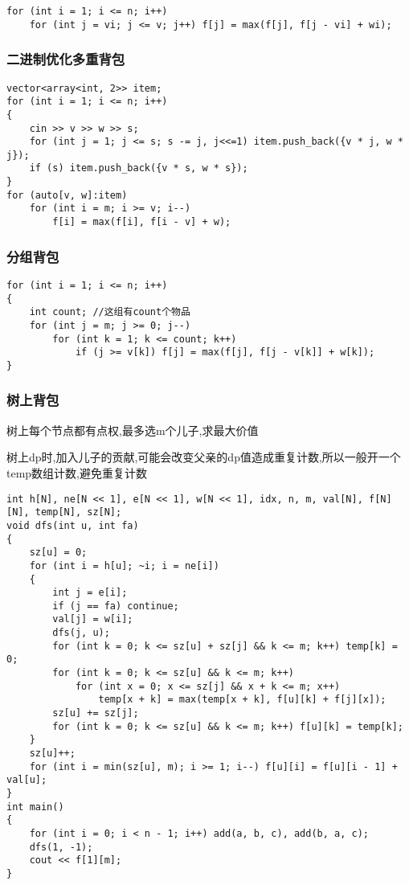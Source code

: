 \documentclass[a4paper, fontset=none]{ctexart}
\begin{document}
\begin{verbatim}
for (int i = 1; i <= n; i++)
    for (int j = vi; j <= v; j++) f[j] = max(f[j], f[j - vi] + wi);
\end{verbatim}

\subsubsection{二进制优化多重背包}

\begin{verbatim}
vector<array<int, 2>> item;
for (int i = 1; i <= n; i++)
{
    cin >> v >> w >> s;
    for (int j = 1; j <= s; s -= j, j<<=1) item.push_back({v * j, w * j});
    if (s) item.push_back({v * s, w * s});
}
for (auto[v, w]:item)
    for (int i = m; i >= v; i--)
        f[i] = max(f[i], f[i - v] + w);
\end{verbatim}
\subsubsection{分组背包}

\begin{verbatim}
for (int i = 1; i <= n; i++)
{
    int count; //这组有count个物品
    for (int j = m; j >= 0; j--)
        for (int k = 1; k <= count; k++)
            if (j >= v[k]) f[j] = max(f[j], f[j - v[k]] + w[k]);
}
\end{verbatim}
\subsubsection{树上背包}

树上每个节点都有点权,最多选m个儿子,求最大价值

树上dp时,加入儿子的贡献,可能会改变父亲的dp值造成重复计数,所以一般开一个temp数组计数,避免重复计数

\begin{verbatim}
int h[N], ne[N << 1], e[N << 1], w[N << 1], idx, n, m, val[N], f[N][N], temp[N], sz[N];
void dfs(int u, int fa)
{
    sz[u] = 0;
    for (int i = h[u]; ~i; i = ne[i])
    {
        int j = e[i];
        if (j == fa) continue;
        val[j] = w[i];
        dfs(j, u);
        for (int k = 0; k <= sz[u] + sz[j] && k <= m; k++) temp[k] = 0;
        for (int k = 0; k <= sz[u] && k <= m; k++)
            for (int x = 0; x <= sz[j] && x + k <= m; x++)
                temp[x + k] = max(temp[x + k], f[u][k] + f[j][x]);
        sz[u] += sz[j];
        for (int k = 0; k <= sz[u] && k <= m; k++) f[u][k] = temp[k];
    }
    sz[u]++;
    for (int i = min(sz[u], m); i >= 1; i--) f[u][i] = f[u][i - 1] + val[u];
}
int main()
{
    for (int i = 0; i < n - 1; i++) add(a, b, c), add(b, a, c);
    dfs(1, -1);
    cout << f[1][m];
}
\end{verbatim}
\end{document}
